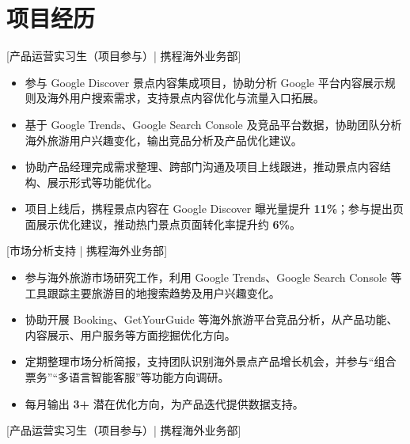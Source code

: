 \documentclass{resume}
\begin{document}
\section{项目经历}

[\textnormal{产品运营实习生（项目参与）| 携程海外业务部}]

\begin{itemize}

\item 参与 Google Discover 景点内容集成项目，协助分析 Google 平台内容展示规则及海外用户搜索需求，支持景点内容优化与流量入口拓展。

\item 基于 Google Trends、Google Search Console 及竞品平台数据，协助团队分析海外旅游用户兴趣变化，输出竞品分析及产品优化建议。

\item 协助产品经理完成需求整理、跨部门沟通及项目上线跟进，推动景点内容结构、展示形式等功能优化。

\item 项目上线后，携程景点内容在 Google Discover 曝光量提升 \textbf{11\%}；参与提出页面展示优化建议，推动热门景点页面转化率提升约 \textbf{6\%}。

\end{itemize}

[\textnormal{市场分析支持 | 携程海外业务部}]

\begin{itemize}

\item 参与海外旅游市场研究工作，利用 Google Trends、Google Search Console 等工具跟踪主要旅游目的地搜索趋势及用户兴趣变化。

\item 协助开展 Booking、GetYourGuide 等海外旅游平台竞品分析，从产品功能、内容展示、用户服务等方面挖掘优化方向。

\item 定期整理市场分析简报，支持团队识别海外景点产品增长机会，并参与“组合票务”“多语言智能客服”等功能方向调研。

\item 每月输出 \textbf{3+} 潜在优化方向，为产品迭代提供数据支持。

\end{itemize}

[\textnormal{产品运营实习生（项目参与）| 携程海外业务部}]
\end{document}
